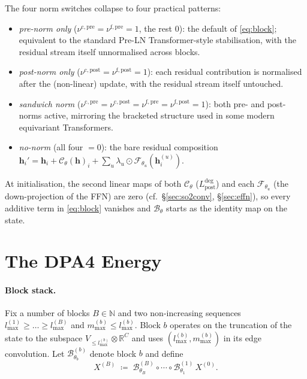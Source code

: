 \documentclass[11pt,a4paper]{article}
\newcommand{\R}{\mathbb{R}}
\newcommand{\N}{\mathbb{N}}
\newcommand{\bh}{\bm{h}}
\newcommand{\lmax}{l_{\max}}
\newcommand{\mmax}{m_{\max}}
\theoremstyle{plain}
\theoremstyle{definition}
\theoremstyle{remark}
\begin{document}
The four norm switches collapse to four practical patterns:
\begin{itemize}[leftmargin=2em]
    \item \emph{pre-norm only} ($\nu^{\mathrm{c,pre}}=\nu^{\mathrm{f,pre}}=1$, the rest $0$): the default of \eqref{eq:block}; equivalent to the standard Pre-LN Transformer-style stabilisation, with the residual stream itself unnormalised across blocks.
    \item \emph{post-norm only} ($\nu^{\mathrm{c,post}}=\nu^{\mathrm{f,post}}=1$): each residual contribution is normalised after the (non-linear) update, with the residual stream itself untouched.
    \item \emph{sandwich norm} ($\nu^{\mathrm{c,pre}}=\nu^{\mathrm{c,post}}=\nu^{\mathrm{f,pre}}=\nu^{\mathrm{f,post}}=1$): both pre- and post-norms active, mirroring the bracketed structure used in some modern equivariant Transformers.
    \item \emph{no-norm} (all four $=0$): the bare residual composition $\bh_i'=\bh_i+\mathcal{C}_\theta(\bh)_i+\sum_u\lambda_u\odot\mathcal{F}_{\theta_u}(\bh_i^{(u)})$.
\end{itemize}
At initialisation, the second linear maps of both $\mathcal{C}_\theta$ ($L^{\mathrm{deg}}_{\mathrm{post}}$) and each $\mathcal{F}_{\theta_u}$ (the down-projection of the FFN) are zero (cf.\ \S\ref{sec:so2conv}, \S\ref{sec:effn}), so every additive term in \eqref{eq:block} vanishes and $\mathcal{B}_\theta$ starts as the identity map on the state.

\section{The DPA4 Energy}\label{sec:energy}

\paragraph{Block stack.}
Fix a number of blocks $B\in\N$ and two non-increasing sequences
$\lmax^{(1)}\geq\dots\geq\lmax^{(B)}$ and $\mmax^{(b)}\leq\lmax^{(b)}$. Block
$b$ operates on the truncation of the state to the subspace
$V_{\le\lmax^{(b)}}\otimes\R^C$ and uses $(\lmax^{(b)},\mmax^{(b)})$ in its
edge convolution. Let $\mathcal{B}_{\theta_b}^{(b)}$ denote block $b$ and
define
\begin{equation}\label{eq:final-state}
    X^{(B)} \;\coloneqq\;\mathcal{B}_{\theta_B}^{(B)}\circ\cdots\circ\mathcal{B}_{\theta_1}^{(1)}\,X^{(0)}.
\end{equation}
\end{document}
